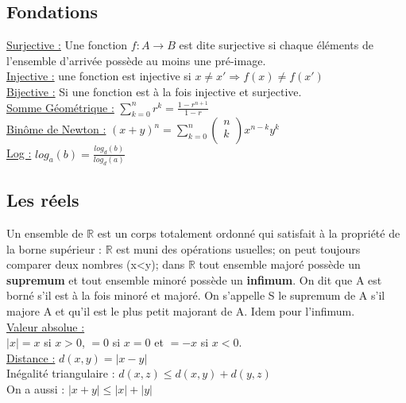 \documentclass[../main.tex]{subfiles}
\begin{document}
\localtableofcontents
\subsection{Fondations}\quad \underline{Surjective :} Une fonction $f:A\rightarrow B$ est dite surjective si chaque éléments de l'ensemble d'arrivée possède au moins une pré-image.\\

\quad \underline{Injective :} une fonction est injective si $x\neq x' \Rightarrow f(x) \neq f(x')$\\

\quad \underline{Bijective :} Si une fonction est à la fois injective et surjective.\\

\quad \underline{Somme Géométrique :} $\sum_{k=0}^n r^k = \frac{1-r^{n+1}}{1-r}$\\

\quad \underline{Binôme de Newton :} $(x+y)^n = \sum_{k=0}^n \begin{pmatrix}
    n\\
    k\\
\end{pmatrix} x^{n-k} y^k$\\

\quad \underline{Log :} $log_a(b) = \frac{log_d(b)}{log_d(a)}$\\

\subsection{Les réels}
Un ensemble de $\mathbb{R}$ est un corps totalement ordonné qui satisfait à la propriété de la borne supérieur : $\mathbb{R}$ est muni des opérations usuelles; on peut toujours comparer deux nombres (x<y); dans $\mathbb{R}$ tout ensemble majoré possède un \textbf{supremum} et tout ensemble minoré possède un \textbf{infimum}. On dit que A est borné s'il est à la fois minoré et majoré. On s'appelle S le supremum de A s'il majore A et qu'il est le plus petit majorant de A. Idem pour l'infimum.\\

\quad \underline{Valeur absolue :}\\
$|x| = x$ si $x>0$, $=0$ si $x=0$ et $=-x$ si $x<0$.\\

\quad \underline{Distance :} $d(x,y) = |x-y|$\\
Inégalité triangulaire : $d(x,z) \leq d(x,y) + d(y,z)$\\
On a aussi : $|x+y| \leq |x| + |y|$\\
\end{document}
